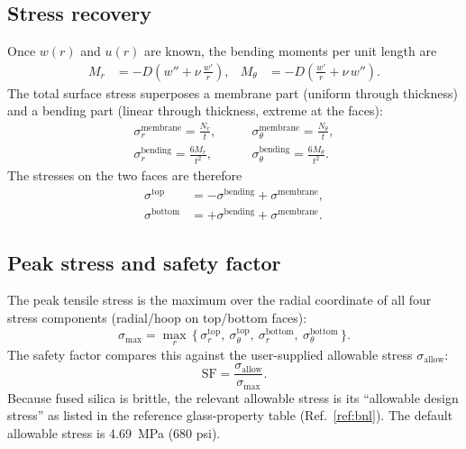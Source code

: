 \documentclass[11pt]{article}
\begin{document}
\subsection{Stress recovery}

Once $w(r)$ and $u(r)$ are known, the bending moments per unit length are
%
\begin{align}
  M_{r} &= -D\left( w'' + \nu\,\frac{w'}{r} \right), &
  M_{\theta} &= -D\left( \frac{w'}{r} + \nu\,w'' \right).
\end{align}
%
The total surface stress superposes a membrane part (uniform through thickness)
and a bending part (linear through thickness, extreme at the faces):
%
\begin{align}
  \sigma_{r}^{\text{membrane}} = \frac{N_{r}}{t}, &\qquad
  \sigma_{\theta}^{\text{membrane}} = \frac{N_{\theta}}{t}, \\[4pt]
  \sigma_{r}^{\text{bending}} = \frac{6 M_{r}}{t^{2}}, &\qquad
  \sigma_{\theta}^{\text{bending}} = \frac{6 M_{\theta}}{t^{2}}.
\end{align}
%
The stresses on the two faces are therefore
%
\begin{align}
  \sigma^{\text{top}} &= -\sigma^{\text{bending}} + \sigma^{\text{membrane}}, \\
  \sigma^{\text{bottom}} &= +\sigma^{\text{bending}} + \sigma^{\text{membrane}}.
\end{align}

\subsection{Peak stress and safety factor}

The peak tensile stress is the maximum over the radial coordinate of all four
stress components (radial/hoop on top/bottom faces):
%
\begin{equation}
  \sigma_{\max} = \max_{r}\, \bigl\{\,
    \sigma_{r}^{\text{top}},\ \sigma_{\theta}^{\text{top}},\
    \sigma_{r}^{\text{bottom}},\ \sigma_{\theta}^{\text{bottom}}
  \,\bigr\}.
\end{equation}
%
The safety factor compares this against the user-supplied allowable stress
$\sigma_{\text{allow}}$:
%
\begin{equation}
  \text{SF} = \frac{\sigma_{\text{allow}}}{\sigma_{\max}}.
\end{equation}
%
Because fused silica is brittle, the relevant allowable stress is its
``allowable design stress'' as listed in the reference glass-property table
(Ref.~\ref{ref:bnl}).
The default allowable stress is \qty{4.69}{\mega\pascal} (\num{680} psi).
\end{document}

